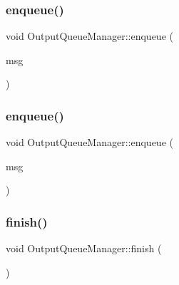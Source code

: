 \mbox{\label{class_output_queue_manager_a56584d3f134b6b82d89966ff279b5ad3}} 
\subsubsection{\texorpdfstring{enqueue()}{enqueue()}\hspace{0.1cm}{\footnotesize\ttfamily [1/2]}}
{\footnotesize\ttfamily void Output\+Queue\+Manager\+::enqueue (\begin{DoxyParamCaption}\item[{std\+::shared\+\_\+ptr$<$ \mbox{\hyperlink{class_output_message}{Output\+Message}} $>$}]{msg }\end{DoxyParamCaption})\hspace{0.3cm}{\ttfamily [inline]}}

\mbox{\label{class_output_queue_manager_abcd58c0a7cfa9f8b5e74f3dd0ab65c2f}} 
\subsubsection{\texorpdfstring{enqueue()}{enqueue()}\hspace{0.1cm}{\footnotesize\ttfamily [2/2]}}
{\footnotesize\ttfamily void Output\+Queue\+Manager\+::enqueue (\begin{DoxyParamCaption}\item[{std\+::shared\+\_\+ptr$<$ \mbox{\hyperlink{class_output_message}{Output\+Message}} $>$}]{msg }\end{DoxyParamCaption})}

\mbox{\label{class_output_queue_manager_abc1a72e97cdcd113097e3498ce4dfef1}} 
\subsubsection{\texorpdfstring{finish()}{finish()}}
{\footnotesize\ttfamily void Output\+Queue\+Manager\+::finish (\begin{DoxyParamCaption}{ }\end{DoxyParamCaption})}

